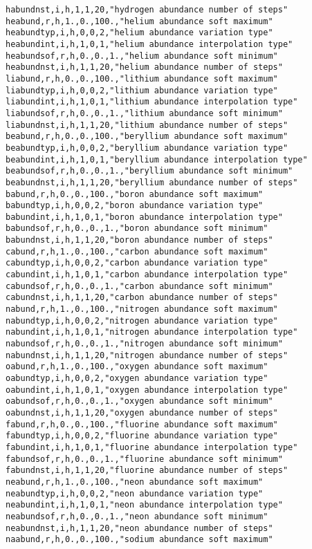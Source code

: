 \begin{verbatim}
habundnst,i,h,1,1,20,"hydrogen abundance number of steps"
heabund,r,h,1.,0.,100.,"helium abundance soft maximum"
heabundtyp,i,h,0,0,2,"helium abundance variation type"
heabundint,i,h,1,0,1,"helium abundance interpolation type"
heabundsof,r,h,0.,0.,1.,"helium abundance soft minimum"
heabundnst,i,h,1,1,20,"helium abundance number of steps"
liabund,r,h,0.,0.,100.,"lithium abundance soft maximum"
liabundtyp,i,h,0,0,2,"lithium abundance variation type"
liabundint,i,h,1,0,1,"lithium abundance interpolation type"
liabundsof,r,h,0.,0.,1.,"lithium abundance soft minimum"
liabundnst,i,h,1,1,20,"lithium abundance number of steps"
beabund,r,h,0.,0.,100.,"beryllium abundance soft maximum"
beabundtyp,i,h,0,0,2,"beryllium abundance variation type"
beabundint,i,h,1,0,1,"beryllium abundance interpolation type"
beabundsof,r,h,0.,0.,1.,"beryllium abundance soft minimum"
beabundnst,i,h,1,1,20,"beryllium abundance number of steps"
babund,r,h,0.,0.,100.,"boron abundance soft maximum"
babundtyp,i,h,0,0,2,"boron abundance variation type"
babundint,i,h,1,0,1,"boron abundance interpolation type"
babundsof,r,h,0.,0.,1.,"boron abundance soft minimum"
babundnst,i,h,1,1,20,"boron abundance number of steps"
cabund,r,h,1.,0.,100.,"carbon abundance soft maximum"
cabundtyp,i,h,0,0,2,"carbon abundance variation type"
cabundint,i,h,1,0,1,"carbon abundance interpolation type"
cabundsof,r,h,0.,0.,1.,"carbon abundance soft minimum"
cabundnst,i,h,1,1,20,"carbon abundance number of steps"
nabund,r,h,1.,0.,100.,"nitrogen abundance soft maximum"
nabundtyp,i,h,0,0,2,"nitrogen abundance variation type"
nabundint,i,h,1,0,1,"nitrogen abundance interpolation type"
nabundsof,r,h,0.,0.,1.,"nitrogen abundance soft minimum"
nabundnst,i,h,1,1,20,"nitrogen abundance number of steps"
oabund,r,h,1.,0.,100.,"oxygen abundance soft maximum"
oabundtyp,i,h,0,0,2,"oxygen abundance variation type"
oabundint,i,h,1,0,1,"oxygen abundance interpolation type"
oabundsof,r,h,0.,0.,1.,"oxygen abundance soft minimum"
oabundnst,i,h,1,1,20,"oxygen abundance number of steps"
fabund,r,h,0.,0.,100.,"fluorine abundance soft maximum"
fabundtyp,i,h,0,0,2,"fluorine abundance variation type"
fabundint,i,h,1,0,1,"fluorine abundance interpolation type"
fabundsof,r,h,0.,0.,1.,"fluorine abundance soft minimum"
fabundnst,i,h,1,1,20,"fluorine abundance number of steps"
neabund,r,h,1.,0.,100.,"neon abundance soft maximum"
neabundtyp,i,h,0,0,2,"neon abundance variation type"
neabundint,i,h,1,0,1,"neon abundance interpolation type"
neabundsof,r,h,0.,0.,1.,"neon abundance soft minimum"
neabundnst,i,h,1,1,20,"neon abundance number of steps"
naabund,r,h,0.,0.,100.,"sodium abundance soft maximum"

\end{verbatim}
